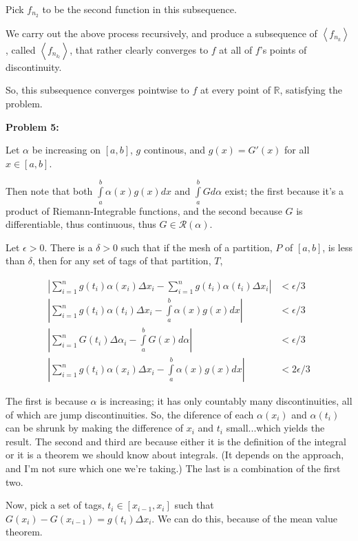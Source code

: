 \documentclass[a4paper,12pt]{article}
\newcommand{\tab}{\hspace{4mm}} %
\newcommand{\shunt}{\vspace{20mm}}
\newcommand{\absval}[1]{\left\lvert #1 \right\rvert}
\newcommand{\anbrack}[1]{\left\langle #1 \right\rangle}
\newcommand{\al}{\alpha} %
\newcommand{\de}{\delta}
\newcommand{\De}{\Delta}
\newcommand{\ep}{\epsilon}
\newcommand{\R}{\mathbb{R}}
\newcommand{\scrR}{\mathcal{R}}
\begin{document}
\tab Pick $f_{n_2}$ to be the second function in this subsequence.

\tab We carry out the above process recursively, and produce a subsequence of $\anbrack{f_{n_k}}$, called $\anbrack{f_{n_{k_l}}}$, that rather clearly converges to $f$ at all of $f$'s points of discontinuity.

So, this subsequence converges pointwise to $f$ at every point of $\R$, satisfying the problem. 

\shunt

{\bf Problem 5:}

Let $\al$ be increasing on $[a,b]$, $g$ continous, and $g(x) = G'(x)$ for all $x \in [a,b]$.

Then note that both $\int\limits_a^b \al(x)g(x)dx$ and $\int\limits_a^b Gd\al$ exist; the first because it's a product of Riemann-Integrable functions, and the second because $G$ is differentiable, thus continuous, thus $G \in \scrR(\al)$.

Let $\ep >0$. There is a $\de >0$ such that if the mesh of a partition, $P$ of $[a,b]$, is less than $\de$, then for any set of tags of that partition, $T$,

\begin{align*}
\absval{\sum\limits_{i=1}^n g(t_i)\al(x_i) \Delta x_i - \sum\limits_{i=1}^n g(t_i)\al(t_i) \Delta x_i} &< \ep/3 \\
\absval{\sum\limits_{i=1}^n g(t_i)\al(t_i) \Delta x_i - \int\limits_a^b \al(x)g(x)dx} &< \ep/3 \\
\absval{\sum\limits_{i=1}^n G(t_i)\Delta \al_i - \int\limits_a^b G(x)d\al} &< \ep/3 \\
\absval{\sum\limits_{i=1}^n g(t_i)\al(x_i) \Delta x_i - \int\limits_a^b \al(x)g(x)dx} &< 2\ep/3
\end{align*}

The first is because $\al$ is increasing; it has only countably many discontinuities, all of which are jump discontinuities. So, the diference of each $\al(x_i)$ and $\al(t_i)$ can be shrunk by making the difference of $x_i$ and $t_i$ small...which yields the result. The second and third are because either it is the definition of the integral or it is a theorem we should know about integrals. (It depends on the approach, and I'm not sure which one we're taking.) The last is a combination of the first two.

Now, pick a set of tags, $t_i \in [x_{i-1},x_i]$ such that $G(x_i) - G(x_{i-1}) = g(t_i)\De x_i$. We can do this, because of the mean value theorem.
\end{document}

